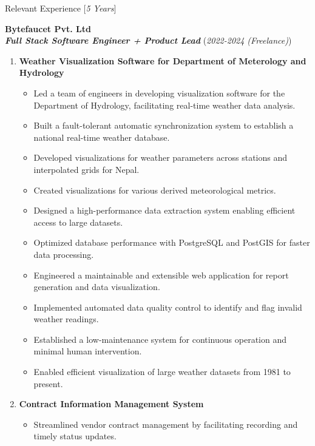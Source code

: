 \documentclass{resume} %
\begin{document}
\begin{rSection}{Relevant Experience [\textit{5 Years}]}
\begin{itemize}
    \end{itemize}

    \large{{\bf Bytefaucet Pvt. Ltd}}
    \\ \small{\textit{\textbf{Full Stack Software Engineer + Product Lead}}} (\small{\textit{2022-2024 (Freelance)}})

    \begin{enumerate}
        \item \textbf{Weather Visualization Software for Department of Meterology and Hydrology}
              \begin{itemize}
                  \item Led a team of engineers in developing visualization software for the Department of Hydrology, facilitating real-time weather data analysis.
                  \item Built a fault-tolerant automatic synchronization system to establish a national real-time weather database.
                  \item Developed visualizations for weather parameters across stations and interpolated grids for Nepal.
                  \item Created visualizations for various derived meteorological metrics.
                  \item Designed a high-performance data extraction system enabling efficient access to large datasets.
                  \item Optimized database performance with PostgreSQL and PostGIS for faster data processing.
                  \item Engineered a maintainable and extensible web application for report generation and data visualization.
                  \item Implemented automated data quality control to identify and flag invalid weather readings.
                  \item Established a low-maintenance system for continuous operation and minimal human intervention.
                  \item Enabled efficient visualization of large weather datasets from 1981 to present.
              \end{itemize}
        \item \textbf{Contract Information Management System}
              \begin{itemize}
                  \item Streamlined vendor contract management by facilitating recording and timely status updates.

\end{itemize}
\end{enumerate}
\end{rSection}
\end{document}
